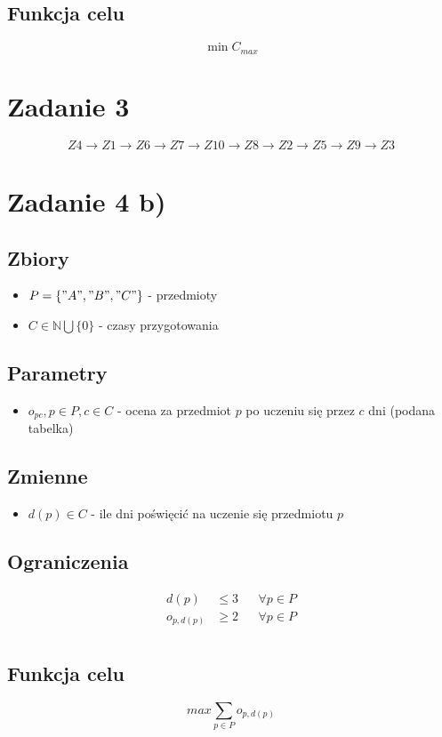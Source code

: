 \documentclass{report}
\begin{document}
\subsection*{Funkcja celu}
$$\min{C_{max}}$$

\section*{Zadanie 3}
$$
    Z4 \rightarrow
    Z1 \rightarrow
    Z6 \rightarrow
    Z7 \rightarrow
    Z10 \rightarrow
    Z8 \rightarrow
    Z2 \rightarrow
    Z5 \rightarrow
    Z9 \rightarrow
    Z3
$$

\section*{Zadanie 4 b)}
\subsection*{Zbiory}
\begin{itemize}
    \item $P = \{"A", "B", "C"\}$ - przedmioty
    \item $C \in \mathbb{N} \bigcup \{0\} $ - czasy przygotowania
\end{itemize}

\subsection*{Parametry}
\begin{itemize}
    \item $o_{pc}, p \in P, c \in C$ - ocena za przedmiot
          $p$ po uczeniu się przez $c$ dni (podana tabelka)
\end{itemize}

\subsection*{Zmienne}
\begin{itemize}
    \item $d(p) \in C$ - ile dni poświęcić na uczenie się
          przedmiotu $p$
\end{itemize}

\subsection*{Ograniczenia}
\begin{align*}
    d(p)       & \le 3 &  & \forall p \in P \\
    o_{p,d(p)} & \ge 2 &  & \forall p \in P \\
\end{align*}

\subsection*{Funkcja celu}
$$max{ \sum_{p \in P} o_{p,d(p)}}$$
\end{document}
